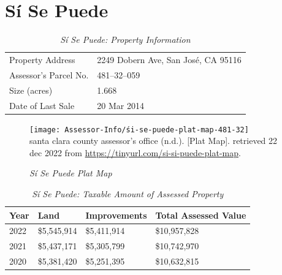 
\clearpage
\section{Sí Se Puede}\label{sec:śi-se-puede-plat-map}\indent

\begin{table}[htb]
  \SingleSpacing%
  \caption[Sí Se Puede: Property Information]{\textit{Sí Se Puede: Property Information}}\label{tab:sí-se-puede-prop-info}
  \begin{tabular}{ll}
    \toprule
    Property Address      & 2249 Dobern Ave, San José, CA 95116 \\
    Assessor's Parcel No. &  481–32–059 \\
    Size (acres)          &  1.668\\
    Date of Last Sale     &  20 Mar 2014 \\
    \bottomrule
  \end{tabular}
\end{table}

\begin{figure}[hbt]
  \centering
  \caption[Sí Se Puede Plat Map]{\textit{Sí Se Puede Plat Map}}\label{fig:sí-se-puede}
    \texttt{[image: Assessor-Info/śi-se-puede-plat-map-481-32]}\\ %
  \footnotesize{santa clara county assessor's office (n.d.). [Plat Map]. retrieved 22 dec 2022 from \url{https://tinyurl.com/si-si-puede-plat-map}}.
\end{figure}

\begin{table}[htb]
  \SingleSpacing%
  \caption[Sí Se Puede: Taxable Amount of Assessed Property]{\textit{Sí Se Puede: Taxable Amount of Assessed Property}}\label{tab:sí-se-puede-taxable-amount}
  \begin{tabular}{llll}
    \toprule
    Year & Land        & Improvements & Total Assessed Value \\
    \midrule
    2022 & \$5,545,914 & \$5,411,914  & \$10,957,828 \\
    2021 & \$5,437,171 & \$5,305,799  & \$10,742,970 \\
    2020 & \$5,381,420 & \$5,251,395  & \$10,632,815 \\
    \bottomrule
  \end{tabular}
\end{table}

